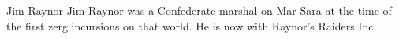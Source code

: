 \documentclass[journal]{IEEEtran}
\begin{document}
\ifCLASSOPTIONcaptionsoff
  \newpage
\fi

                                                    



\begin{IEEEbiography}{Jim Raynor}
Jim Raynor was a Confederate marshal on Mar Sara at the time of the first zerg incursions on that world. He is now with Raynor's Raiders Inc.
\end{IEEEbiography}
\end{document}
